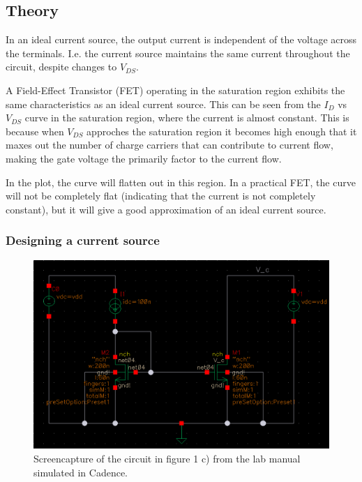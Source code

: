 \documentclass[onecolumn]{article}
\begin{document}
\subsection*{Theory}

In an ideal current source, the output current is independent of the voltage across the terminals. I.e. the current source maintains the same current throughout the circuit, despite changes to $V_{DS}$.

A Field-Effect Transistor (FET) operating in the saturation region exhibits the same characteristics as an ideal current source. This can be seen from the $I_D$ vs $V_{DS}$ curve in the saturation region, where the current is almost constant. This is because when  $V_{DS}$ approches the saturation region it becomes high enough that it maxes out the number of charge carriers that can contribute to current flow, making the gate voltage the primarily factor to the current flow.

In the plot, the curve will flatten out in this region. In a practical FET, the curve will not be completely flat (indicating that the current is not completely constant), but it will give a good approximation of an ideal current source.


 \clearpage

\subsubsection*{Designing a current source}

\begin{figure}[h!]
    \centering
    \includegraphics[width=1\textwidth]{circuit_c_fixed.png}
    \caption{Screencapture of the circuit in figure 1 c) from the lab manual simulated in Cadence.}
    \label{fig:circuitc}
\end{figure}
\end{document}
